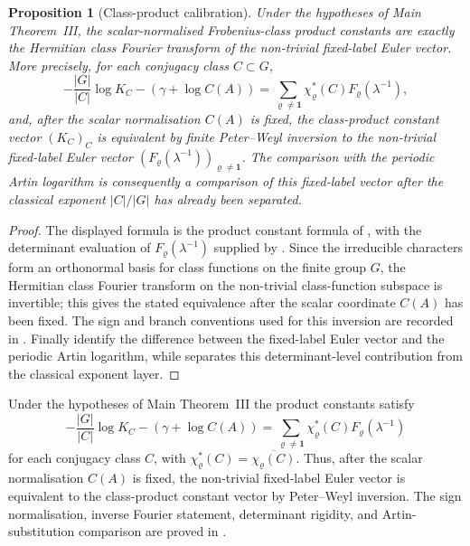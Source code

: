 \documentclass[11pt,a4paper]{amsart}
\theoremstyle{plain}
\newtheorem{proposition}[theorem]{Proposition}
\theoremstyle{definition}
\theoremstyle{remark}
\begin{document}
\begin{proposition}[Class-product calibration]
  \label{rem:intro-class-product-calibration}
  Under the hypotheses of Main Theorem~III, the scalar-normalised
  Frobenius-class product constants are exactly the Hermitian class Fourier
  transform of the non-trivial fixed-label Euler vector.  More precisely, for
  each conjugacy class \(C\subset G\),
  \[
    -\frac{|G|}{|C|}\log K_C-(\gamma+\log C(A))
    =
    \sum_{\varrho\ne\mathbf1}
      \chi_\varrho^\ast(C)F_\varrho(\lambda^{-1}),
  \]
  and, after the scalar normalisation \(C(A)\) is fixed, the class-product
  constant vector \((K_C)_C\) is equivalent by finite Peter--Weyl inversion to
  the non-trivial fixed-label Euler vector
  \((F_\varrho(\lambda^{-1}))_{\varrho\ne\mathbf1}\).  The comparison with the
  periodic Artin logarithm is consequently a comparison of this fixed-label
  vector after the classical exponent \(|C|/|G|\) has already been separated.
\end{proposition}
\begin{proof}
  The displayed formula is the product constant formula of
  , with the determinant evaluation of
  \(F_\varrho(\lambda^{-1})\) supplied by
  .
  Since the irreducible characters form an orthonormal basis for class
  functions on the finite group \(G\), the Hermitian class Fourier transform on
  the non-trivial class-function subspace is invertible; this gives the stated
  equivalence after the scalar coordinate \(C(A)\) has been fixed.  The sign and
  branch conventions used for this inversion are recorded in
  .
  Finally 
  identify the difference between the fixed-label Euler vector and the periodic
  Artin logarithm, while
   separates this determinant-level
  contribution from the classical exponent layer.
\end{proof}

Under the hypotheses of Main Theorem~III the product constants satisfy
\[
  -\frac{|G|}{|C|}\log K_C-(\gamma+\log C(A))
  =
  \sum_{\varrho\ne\mathbf1}
    \chi_\varrho^\ast(C)F_\varrho(\lambda^{-1})
\]
for each conjugacy class \(C\), with
\(\chi_\varrho^\ast(C)=\overline{\chi_\varrho(C)}\).  Thus, after the scalar
normalisation \(C(A)\) is fixed, the non-trivial fixed-label Euler vector is
equivalent to the class-product constant vector by Peter--Weyl inversion.
The sign normalisation, inverse Fourier statement, determinant rigidity, and
Artin-substitution comparison are proved in
.
\end{document}
